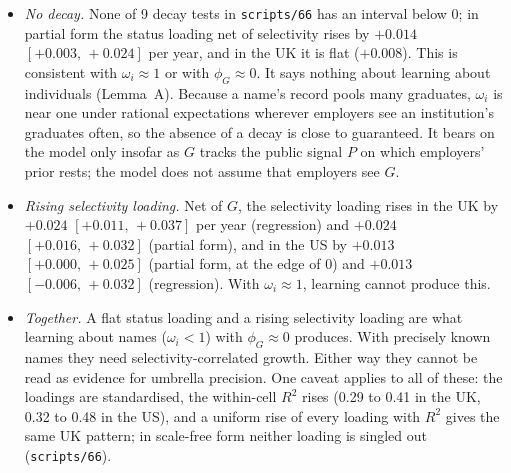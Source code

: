\documentclass[11pt]{article}
\newcommand{\ci}[2]{$[#1,\allowbreak\,#2]$}
\begin{document}
\begin{itemize}
\item \emph{No decay.} None of 9 decay tests in \texttt{scripts/66} has an interval below 0; in partial form the
status loading net of selectivity rises by $+0.014$ \ci{+0.003}{+0.024} per year, and in the UK it is flat
($+0.008$). This is consistent with $\omega_i\approx1$ or with $\phi_G\approx0$. It says nothing about learning about individuals (Lemma~A). Because a name's record pools many graduates,
$\omega_i$ is near one under rational expectations wherever employers see an institution's graduates often, so
the absence of a decay is close to guaranteed. It bears on the model only insofar as $G$ tracks the public signal $P$ on which
employers' prior rests; the model does not assume that employers see $G$.
\item \emph{Rising selectivity loading.} Net of $G$, the selectivity loading rises in the UK by $+0.024$
\ci{+0.011}{+0.037} per year (regression) and $+0.024$ \ci{+0.016}{+0.032} (partial form), and in the US by $+0.013$
\ci{+0.000}{+0.025} (partial form, at the edge of 0) and $+0.013$ \ci{-0.006}{+0.032} (regression). With
$\omega_i\approx1$, learning cannot produce this.
\item \emph{Together.} A flat status loading and a rising selectivity loading are what learning about names
($\omega_i<1$) with $\phi_G\approx0$ produces. With precisely known names they need selectivity-correlated growth.
Either way they cannot be read as evidence for umbrella precision. One caveat applies to all of these: the loadings are standardised, the
within-cell $R^2$ rises (0.29 to 0.41 in the UK, 0.32 to 0.48 in the US), and a uniform rise of every loading with
$R^2$ gives the same UK pattern; in scale-free form neither loading is singled out (\texttt{scripts/66}).
\end{itemize}
\end{document}
